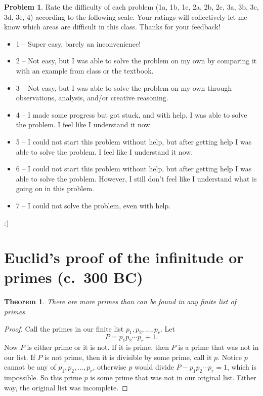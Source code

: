 \documentclass[11pt,oneside]{amsart}
\theoremstyle{definition}
\newtheorem{problem}{Problem}
\theoremstyle{plain}
\newtheorem{theorem}{Theorem}
\begin{document}
    \begin{problem}
        Rate the difficulty of each problem (1a, 1b, 1c, 2a, 2b, 2c, 3a, 3b, 3c, 3d, 3e, 4) according to the following scale. Your ratings will collectively let me know which areas are difficult in this class. Thanks for your feedback!
        \begin{itemize}
            \item 1 -- Super easy, barely an inconvenience!
            \item 2 -- Not easy, but I was able to solve the problem on my own by comparing it with an example from class or the textbook.
            \item 3 -- Not easy, but I was able to solve the problem on my own through observations, analysis, and/or creative reasoning.
            \item 4 -- I made some progress but got stuck, and with help, I was able to solve the problem. I feel like I understand it now.
            \item 5 -- I could not start this problem without help, but after getting help I was able to solve the problem. I feel like I understand it now.
            \item 6 -- I could not start this problem without help, but after getting help I was able to solve the problem. However, I still don't feel like I understand what is going on in this problem.
            \item 7 -- I could not solve the problem, even with help.
        \end{itemize}
    \end{problem}
    \begin{solution}
        :)
    \end{solution}

    \newpage

    \section{Euclid's proof of the infinitude or primes (c.\ 300 BC)}
    \begin{theorem}
        There are more primes than can be found in any finite list of primes.
    \end{theorem}
    \begin{proof}
        Call the primes in our finite list $p_1,p_2,\dots,p_r$.  Let
        \[P=p_1p_2\cdots p_r+1.\]
        Now $P$ is either prime or it is not. If it is prime, then $P$ is a prime that was not in our list.  If $P$ is not prime, then it is divisible by some prime, call it $p$.  Notice $p$ cannot be any of $p_1,p_2,\dots,p_r$, otherwise $p$ would divide $P-p_1p_2\cdots p_r=1$, which is impossible.  So this prime $p$ is some prime that was not in our original list.  Either way, the original list was incomplete.
    \end{proof}
\end{document}
